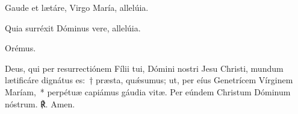 
\noindent \vv Gaude et lætáre, Virgo María, allelúia.

\noindent \rr Quia surréxit Dóminus vere, allelúia.

Orémus.

\noindent Deus, qui per resurrectiónem Fílii tui, Dómini nostri Jesu Christi, mundum lætificáre dignátus es:~† præsta, quǽsumus; ut, per eíus Genetrícem Vírginem Maríam,~* perpétuæ capiámus gáudia vitæ. Per eúndem Christum Dóminum nóstrum.  ℟. Amen.